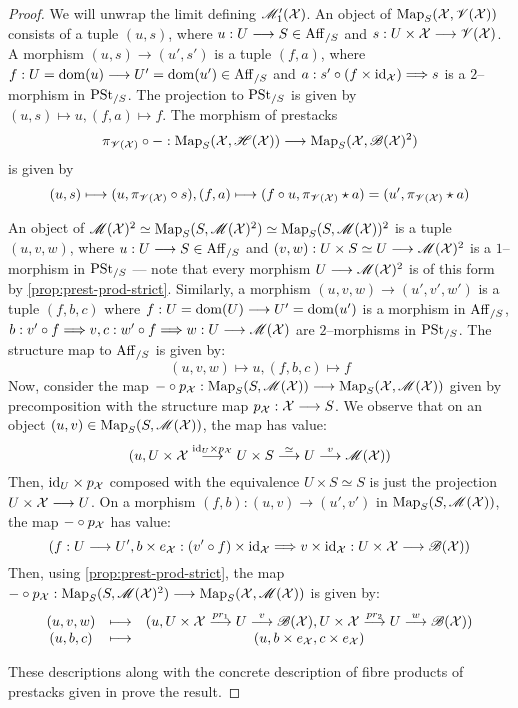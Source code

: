 \documentclass[11pt]{amsart}
\begin{document}
\begin{proof}
We will unwrap the limit defining $\mathscr{M}_1'(\mathcal{X})$.
An object of $\mathrm{Map}_S(\mathcal{X}, \mathscr{V}(\mathcal{X}))$ consists of a tuple
$(u, s)$, where $u : U \to S \in \Aff_{/S}$ and
$s : U \times \mcX \to \sV(\mcX)$. A  morphism $(u, s) \to (u', s')$
is a tuple $(f, a)$, where $f : U = \dom(u) \to U' = \dom(u') \in \Aff_{/S}$
and $a : s' \circ (f \times \id_\mcX) \To s$ is a $2$--morphism in $\mathrm{PSt}_{/S}$.
The projection to $\mathrm{PSt}_{/S}$ is given by
$(u, s) \mapsto u, (f, a) \mapsto f$.
The morphism of prestacks
\[
\pi_{\sV(\mcX)} \circ - :
    \Map_S(\mcX, \sH(\mcX)) \to \Map_S(\mcX, \sB(\mcX)^2)
\]
is given by
\[
(u, s) \mapsto (u, \pi_{\sV(\mcX)} \circ s),
(f, a) \mapsto (f \circ u, \pi_{\sV(\mcX)} \star a)
    = (u', \pi_{\sV(\mcX)} \star a)
\]

An object of
$\mathscr{M}(\mathcal{X})^2 \simeq \mathrm{Map}_S(S, \mathscr{M}(\mathcal{X})^2) \simeq \mathrm{Map}_S(S, \mathscr{M}(\mathcal{X}))^2$
is a tuple $(u, v, w)$, where $u : U \to S \in \Aff_{/S}$ and
$(v, w) : U \times S \simeq U \to \sM(\mcX)^2$ is a $1$--morphism
in $\mathrm{PSt}_{/S}$ --- note that every morphism $U \to \sM(\mcX)^2$ is of this
form by \cref{prop:prest-prod-strict}. Similarly, a morphism
$(u, v, w) \to (u', v', w')$ is a tuple $(f, b, c)$ where
$f : U = \dom(U) \to U' = \dom(u')$ is a morphism in $\mathrm{Aff}_{/S}$,
$b : v' \circ f \To v, c : w' \circ f \To w : U \to \sM(\mcX)$
are $2$--morphisms in $\mathrm{PSt}_{/S}$. The structure map to $\mathrm{Aff}_{/S}$
is given by:
\[
(u, v, w) \mapsto u, (f, b, c) \mapsto f
\]
Now, consider the map
$- \circ p_\mcX : \Map_S(S, \sM(\mcX)) \to \Map_S(\mcX, \sM(\mcX))$ given
by precomposition with the structure map $p_\mcX : \mcX \to S$. We observe that
on an object $(u, v) \in \mathrm{Map}_S(S, \mathscr{M}(\mathcal{X}))$, the map has value:
\[
(u, U \times \mcX
      \to[\id_U \times p_\mcX] U \times S
      \to[\simeq] U
      \to[v] \sM(\mcX))
\]
Then, $\mathrm{id}_U \times p_\mathcal{X}$ composed with the equivalence $U \times S \simeq S$
is just the projection $U \times \mcX \to U$. On a morphism
$(f, b) : (u, v) \to (u', v')$ in $\mathrm{Map}_S(S, \mathscr{M}(\mathcal{X}))$, the map
$- \circ p_\mathcal{X}$ has value:
\[
(f : U \to U',
b \times e_\mcX
  : (v' \circ f) \times \id_\mcX \To v \times \id_\mcX
  : U \times \mcX \to \sB(\mcX))
\]
Then, using \cref{prop:prest-prod-strict}, the map
$- \circ p_\mcX : \Map_S(S, \sM(\mcX)^2) \to \Map_S(\mcX, \sM(\mcX))$
is given by:
\[\begin{array}{ccc}
(u, v, w) & \mapsto &
  (u, U \times \mcX \to[pr_1] U \to[v] \sB(\mcX),
      U \times \mcX \to[pr_2] U \to[w] \sB(\mcX)) \\
(u, b, c) & \mapsto & (u, b \times e_\mcX, c \times e_\mcX)
\end{array}\]

These descriptions along with the concrete description of fibre products
of prestacks given in
\cite[\href{https://stacks.math.columbia.edu/tag/0040}{Lemma 0040}]
{stacks-project} prove the result.
\end{proof}
\end{document}
